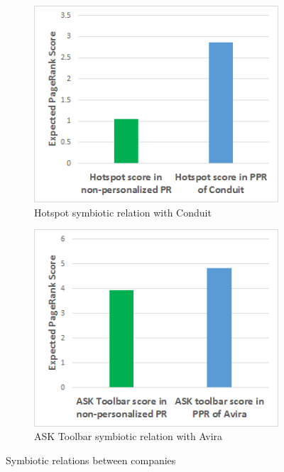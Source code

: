 \documentclass[ijoc,nonblindrev]{informs3} %
\numberwithin{equation}{subsection}
\begin{document}
\begin{figure}[!htbp]
\centering
\begin{subfigure}[b]{0.49\textwidth}
	\centering
\includegraphics[width=\textwidth]{figures/hotspot_sym_conduit.png}
\caption{Hotspot symbiotic relation with Conduit}
\label{fig:hotspot_sym_conduit}
\end{subfigure}
\begin{subfigure}[b]{0.49\textwidth}
	\centering
\includegraphics[width=\textwidth]{figures/ask_sym_avira.png}
\caption{ASK Toolbar symbiotic relation with Avira}
\label{fig:ask_sym_avira}
\end{subfigure}
\caption{Symbiotic relations between companies}
	\label{fig:symbiotic_2}
\end{figure}
\end{document}
